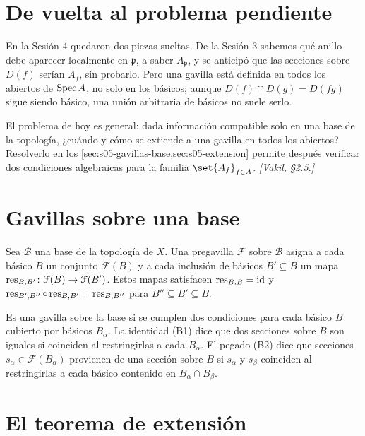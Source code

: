 \section{De vuelta al problema pendiente}

En la Sesión 4 quedaron dos piezas sueltas. De la Sesión 3 sabemos qué anillo debe aparecer localmente en $\mathfrak p$, a saber $A_{\mathfrak p}$, y se anticipó que las secciones sobre $D(f)$ serían $A_f$, sin probarlo. Pero una gavilla está definida en todos los abiertos de $\operatorname{Spec} A$, no solo en los básicos; aunque $D(f)\cap D(g)=D(fg)$ sigue siendo básico, una unión arbitraria de básicos no suele serlo.

El problema de hoy es general: dada información compatible solo en una base de la topología, ¿cuándo y cómo se extiende a una gavilla en todos los abiertos? Resolverlo en los \cref{sec:s05-gavillas-base,sec:s05-extension} permite después verificar dos condiciones algebraicas para la familia $\set{A_f}_{f\in A}$. \emph{[Vakil, \S2.5.]}

\section{Gavillas sobre una base}
\label{sec:s05-gavillas-base}

\begin{defi}
\label{defi:s05-pregavilla-gavilla-sobre-base}
Sea $\mathcal B$ una base de la topología de $X$. Una pregavilla $\mathcal F$ sobre $\mathcal B$ asigna a cada básico $B$ un conjunto $\mathcal F(B)$ y a cada inclusión de básicos $B'\subseteq B$ un mapa $\operatorname{res}_{B,B'}\colon\mathcal F(B)\to\mathcal F(B')$. Estos mapas satisfacen $\operatorname{res}_{B,B}=\operatorname{id}$ y $\operatorname{res}_{B',B''}\circ\operatorname{res}_{B,B'}=\operatorname{res}_{B,B''}$ para $B''\subseteq B'\subseteq B$.

Es una gavilla sobre la base si se cumplen dos condiciones para cada básico $B$ cubierto por básicos $B_\alpha$. La identidad (B1) dice que dos secciones sobre $B$ son iguales si coinciden al restringirlas a cada $B_\alpha$. El pegado (B2) dice que secciones $s_\alpha\in\mathcal F(B_\alpha)$ provienen de una sección sobre $B$ si $s_\alpha$ y $s_\beta$ coinciden al restringirlas a cada básico contenido en $B_\alpha\cap B_\beta$.
\end{defi}

\section{El teorema de extensión}
\label{sec:s05-extension}

